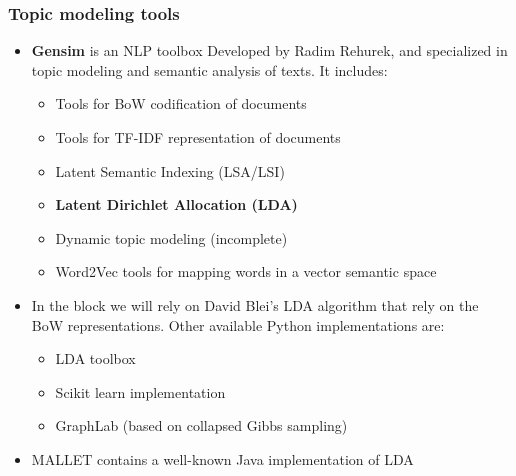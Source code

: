 \documentclass{beamer}
\begin{document}
\begin{frame}

    \frametitle{Topic modeling tools}

	\begin{itemize}
  
    	\item {\bf Gensim} is an NLP toolbox Developed by Radim Rehurek, and specialized in topic modeling and semantic analysis of texts. It includes:
    	\begin{itemize}
			\item Tools for BoW codification of documents
			\item Tools for TF-IDF representation of documents
			\item Latent Semantic Indexing (LSA/LSI)
			\item {\bf Latent Dirichlet Allocation (LDA)}
			\item Dynamic topic modeling (incomplete)
			\item Word2Vec tools for mapping words in a vector semantic space
		\end{itemize}
		\item In the block we will rely on David Blei's LDA algorithm that rely on the BoW representations. Other available Python implementations are:
		\begin{itemize}
			\item LDA toolbox
			\item Scikit learn implementation
			\item GraphLab (based on collapsed Gibbs sampling)
		\end{itemize} 
		\item MALLET contains a well-known Java implementation of LDA
    
    \end{itemize}

\end{frame}
\end{document}
